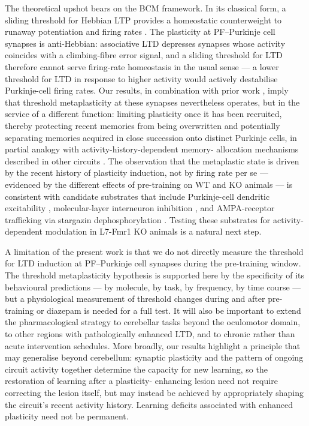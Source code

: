 \documentclass[11pt]{article}
\begin{document}
The theoretical upshot bears on the BCM framework. In its classical form,
a sliding threshold for Hebbian LTP provides a homeostatic counterweight
to runaway potentiation and firing rates \citep{abraham1996metaplasticity}.
The plasticity at PF--Purkinje cell synapses is anti-Hebbian: associative
LTD depresses synapses whose activity coincides with a climbing-fibre
error signal, and a sliding threshold for LTD therefore cannot serve
firing-rate homeostasis in the usual sense --- a lower threshold for LTD
in response to higher activity would actively destabilise Purkinje-cell
firing rates. Our results, in combination with prior work
\citep{nguyenvu2017saturation}, imply that threshold metaplasticity at
these synapses nevertheless operates, but in the service of a different
function: limiting plasticity once it has been recruited, thereby
protecting recent memories from being overwritten and potentially
separating memories acquired in close succession onto distinct Purkinje
cells, in partial analogy with activity-history-dependent memory-
allocation mechanisms described in other circuits \citep{sargin2013creb}.
The observation that the metaplastic state is driven by the recent history
of plasticity induction, not by firing rate per se --- evidenced by the
different effects of pre-training on WT and KO animals --- is consistent
with candidate substrates that include Purkinje-cell dendritic excitability
\citep{ohtsuki2012sk2}, molecular-layer interneuron inhibition
\citep{rowan2018graded}, and AMPA-receptor trafficking via stargazin
dephosphorylation \citep{nomura2012stargazin}. Testing these substrates
for activity-dependent modulation in L7-Fmr1 KO animals is a natural next
step.

A limitation of the present work is that we do not directly measure the
threshold for LTD induction at PF--Purkinje cell synapses during the
pre-training window. The threshold metaplasticity hypothesis is supported
here by the specificity of its behavioural predictions --- by molecule,
by task, by frequency, by time course --- but a physiological measurement
of threshold changes during and after pre-training or diazepam is needed
for a full test. It will also be important to extend the pharmacological
strategy to cerebellar tasks beyond the oculomotor domain, to other
regions with pathologically enhanced LTD, and to chronic rather than
acute intervention schedules. More broadly, our results highlight a
principle that may generalise beyond cerebellum: synaptic plasticity and
the pattern of ongoing circuit activity together determine the capacity
for new learning, so the restoration of learning after a plasticity-
enhancing lesion need not require correcting the lesion itself, but may
instead be achieved by appropriately shaping the circuit's recent activity
history. Learning deficits associated with enhanced plasticity need not
be permanent.



\end{document}

